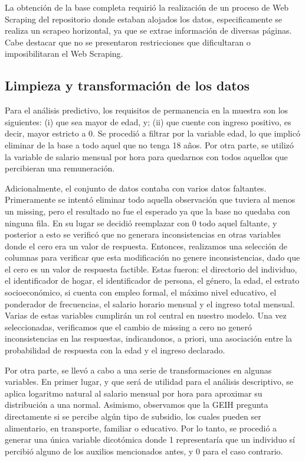 \documentclass[11pt,oneside]{article}
\begin{document}
	La obtención de la base completa requirió la realización de un proceso de Web Scraping del repositorio donde estaban alojados los datos, especificamente se realiza un scrapeo horizontal, ya que se extrae información de diversas páginas. Cabe destacar que no se presentaron restricciones que dificultaran o imposibilitaran el Web Scraping. 
	
	\subsection{Limpieza y transformación de los datos}
	
	Para el análisis predictivo, los requisitos de permanencia en la muestra son los siguientes: (i) que sea mayor de edad, y; (ii) que cuente con ingreso positivo, es decir, mayor estricto a 0. Se procedió a filtrar por la variable edad, lo que implicó eliminar de la base a todo aquel que no tenga 18 años. Por otra parte, se utilizó la variable de salario mensual por hora para quedarnos con todos aquellos que percibieran una remuneración. 
	
	Adicionalmente, el conjunto de datos contaba con varios datos faltantes. Primeramente se intentó eliminar todo aquella observación que tuviera al menos un missing, pero el resultado no fue el esperado ya que la base no quedaba con ninguna fila. En su lugar se decidió reemplazar con 0 todo aquel faltante, y posterior a esto se verificó que no generara inconsistencias en otras variables donde el cero era un valor de respuesta. Entonces, realizamos una selección de columnas para verificar que esta modificación no genere inconsistencias, dado que el cero es un valor de respuesta factible. Estas fueron: el directorio del individuo, el identificador de hogar, el identificador de persona, el género, la edad, el estrato socioeconómico, si cuenta con empleo formal, el máximo nivel educativo, el ponderador de frecuencias, el salario horario mensual y el ingreso total mensual. Varias de estas variables cumplirán un rol central en nuestro modelo. Una vez seleccionadas, verificamos que el cambio de missing a cero no generó inconsistencias en las respuestas, indicandonos, a priori, una asociación entre la probabilidad de respuesta con la edad y el ingreso declarado. 
	
	Por otra parte, se llevó a cabo a una serie de transformaciones en algunas variables. En primer lugar, y que será de utilidad para el análisis descriptivo, se aplica logaritmo natural al salario mensual por hora para aproximar su distribución a una normal. Asimismo, observamos que la GEIH pregunta directamente si se percibe algún tipo de subsidio, los cuales pueden ser alimentario, en transporte, familiar o educativo. Por lo tanto, se procedió a generar una única variable dicotómica donde 1 representaría que un individuo sí percibió alguno de los auxilios mencionados antes, y 0 para el caso contrario.
	
\end{document}

